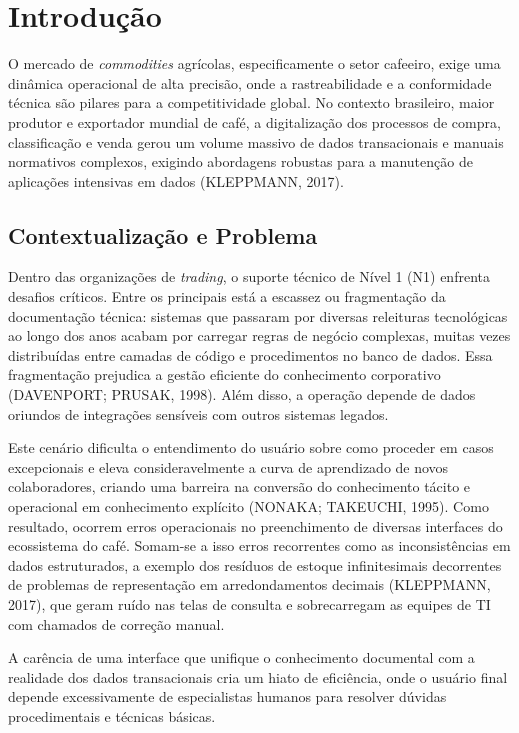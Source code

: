 \chapter{Introdução} \label{Cap:Introducao}

O mercado de \textit{commodities} agrícolas, especificamente o setor cafeeiro, exige uma dinâmica operacional de alta precisão, onde a rastreabilidade e a conformidade técnica são pilares para a competitividade global. No contexto brasileiro, maior produtor e exportador mundial de café, a digitalização dos processos de compra, classificação e venda gerou um volume massivo de dados transacionais e manuais normativos complexos, exigindo abordagens robustas para a manutenção de aplicações intensivas em dados (KLEPPMANN, 2017).

\section{Contextualização e Problema}

Dentro das organizações de \textit{trading}, o suporte técnico de Nível 1 (N1) enfrenta desafios críticos. Entre os principais está a escassez ou fragmentação da documentação técnica: sistemas que passaram por diversas releituras tecnológicas ao longo dos anos acabam por carregar regras de negócio complexas, muitas vezes distribuídas entre camadas de código e procedimentos no banco de dados. Essa fragmentação prejudica a gestão eficiente do conhecimento corporativo (DAVENPORT; PRUSAK, 1998). Além disso, a operação depende de dados oriundos de integrações sensíveis com outros sistemas legados.

Este cenário dificulta o entendimento do usuário sobre como proceder em casos excepcionais e eleva consideravelmente a curva de aprendizado de novos colaboradores, criando uma barreira na conversão do conhecimento tácito e operacional em conhecimento explícito (NONAKA; TAKEUCHI, 1995). Como resultado, ocorrem erros operacionais no preenchimento de diversas interfaces do ecossistema do café. Somam-se a isso erros recorrentes como as inconsistências em dados estruturados, a exemplo dos resíduos de estoque infinitesimais decorrentes de problemas de representação em arredondamentos decimais (KLEPPMANN, 2017), que geram ruído nas telas de consulta e sobrecarregam as equipes de TI com chamados de correção manual.

A carência de uma interface que unifique o conhecimento documental com a realidade dos dados transacionais cria um hiato de eficiência, onde o usuário final depende excessivamente de especialistas humanos para resolver dúvidas procedimentais e técnicas básicas.

